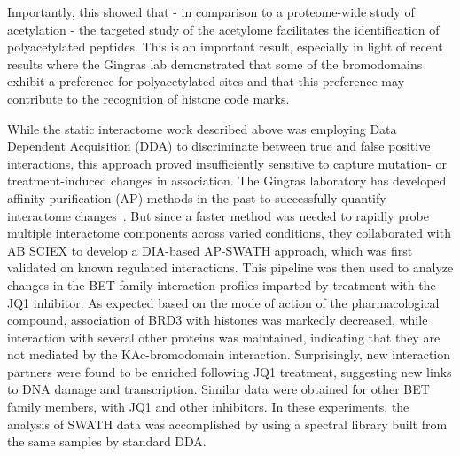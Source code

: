 \documentclass[arial,11pt]{article}
\begin{document}
Importantly, this showed that - in comparison to a proteome-wide study of acetylation - the targeted study of the acetylome facilitates the identification of polyacetylated peptides. This is an important result, especially in light of recent results where the Gingras lab demonstrated that some of the bromodomains exhibit a preference for polyacetylated sites and that this preference may contribute to the recognition of histone code marks. %

While the static interactome work described above was employing Data Dependent Acquisition (DDA) to discriminate between true and false positive interactions, this approach proved insufficiently sensitive to capture mutation- or treatment-induced changes in association.  
%
The Gingras laboratory has developed affinity purification (AP) methods in the past to successfully quantify interactome changes~\cite{choi10,breitkreutz10,filippakopoulos12}. But since a faster method was needed to rapidly probe multiple interactome components across varied conditions, they collaborated with AB SCIEX to develop a DIA-based AP-SWATH approach, which was first validated on known regulated interactions. This pipeline was then used to analyze changes in the BET family interaction profiles imparted by treatment with the JQ1 inhibitor. As expected based on the mode of action of the pharmacological compound, association of BRD3 with histones was markedly decreased, while interaction with several other proteins was maintained, indicating that they are not mediated by the KAc-bromodomain interaction. Surprisingly, new interaction partners were found to be enriched following JQ1 treatment, suggesting new links to DNA damage and transcription. Similar data were obtained for other BET family members, with JQ1 and other inhibitors. In these experiments, the analysis of SWATH data was accomplished by %
using a spectral library built from the same samples by standard DDA.
\end{document}
